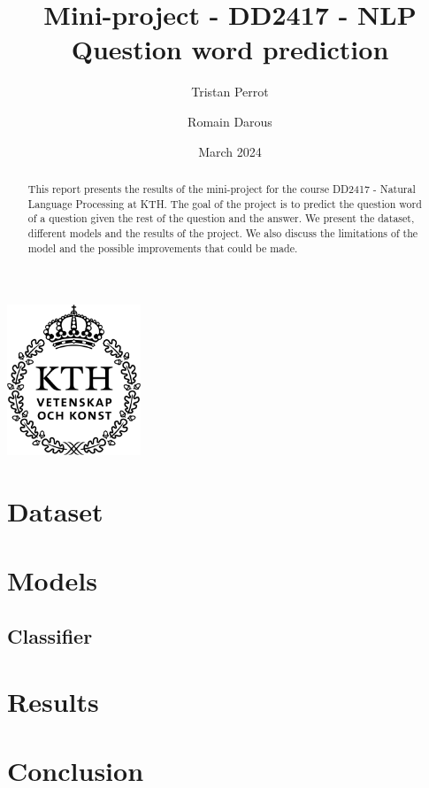 \documentclass{article}
\title{Mini-project - DD2417 - NLP \\ Question word prediction}
\author{Tristan Perrot \and Romain Darous}
\date{March 2024}
\begin{document}
\maketitle
\begin{center}
    \includegraphics[width = 40mm]{images/KTH_logo_RGB_svart.png}
\end{center}

\begin{abstract}
    This report presents the results of the mini-project for the course DD2417 - Natural Language Processing at KTH. The goal of the project is to predict the question word of a question given the rest of the question and the answer. We present the dataset, different models and the results of the project. We also discuss the limitations of the model and the possible improvements that could be made.
\end{abstract}

\section{Dataset}

\section{Models}

\subsection{Classifier}

\section{Results}

\section{Conclusion}
\end{document}
